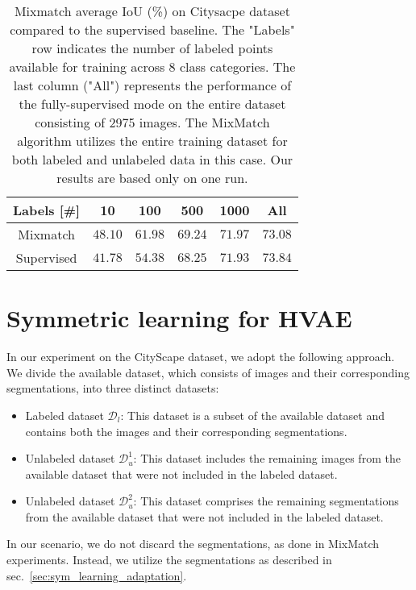 \begin{table}[tbh]
    \begin{tabular}{|c|c|c|c|c|c|}
    \hline
    Labels [\#]  & 10 & 100 & 500 & 1000 & All \\
    \hline
    Mixmatch & $48.10$ & $61.98$ & $69.24$ & $71.97$ & $73.08$ \\
    \hline
    Supervised & $41.78$ & $54.38$ & $68.25$ & $71.93$ & $73.84$ \\
    \hline
    \end{tabular}
    \caption[Mixmatch average IoU on CityScape]{Mixmatch average IoU (\%) on Citysacpe dataset compared to the supervised baseline. The 
    "Labels" row indicates the number of labeled points available for training across 8 class categories. The last 
    column ("All") represents the performance of the fully-supervised mode on the entire dataset consisting of 2975 images. 
    The MixMatch algorithm utilizes the entire training dataset for both labeled and unlabeled data in this case.
    Our results are based only on one run.}
    \label{tab:mixmatch-cityscapes-iou}
\end{table}
     

\section{Symmetric learning for HVAE}
In our experiment on the CityScape dataset, we adopt the following approach. We 
divide the available dataset, which consists of images and their corresponding
segmentations, into three distinct datasets:
\begin{itemize}
    \item  Labeled dataset $\mathcal{D}_l$: This dataset is a subset of the available dataset and contains both the 
    images and their corresponding segmentations.
    \item  Unlabeled dataset $\mathcal{D}^1_u$: This dataset includes the remaining images from the available dataset 
    that were not included in the labeled dataset.
    \item  Unlabeled dataset $\mathcal{D}^2_u$: This dataset comprises the remaining segmentations from the available 
    dataset that were not included in the labeled dataset.
\end{itemize}
    
In our scenario, we do not discard the segmentations, as done in MixMatch experiments. Instead, we utilize the 
segmentations as described in sec.~\ref{sec:sym_learning_adaptation}.

